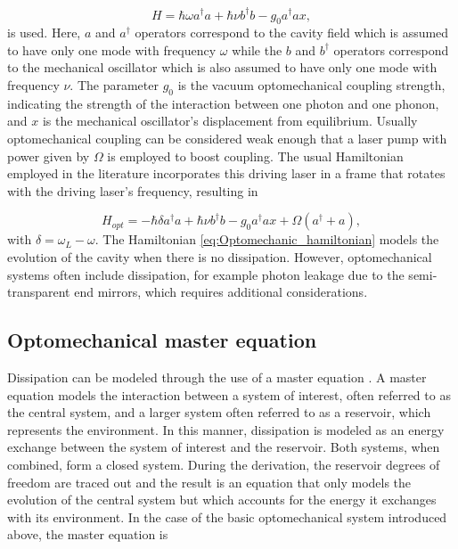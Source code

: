 \documentclass[12pt]{article}
\begin{document}
\begin{equation}\label{eq:basic_hamiltonian}
    H=\hbar \omega a^\dagger a + \hbar\nu b^\dagger b - g_0 a^\dagger a x,
\end{equation}  is used. Here, $a$ and $a^\dagger$ operators correspond to the cavity field which is assumed to have only one mode with frequency $\omega$ while the $b$ and $b^\dagger$ operators correspond to the mechanical oscillator which is also assumed to have only one mode with frequency $\nu$. The parameter $g_0$ is the vacuum optomechanical coupling strength, indicating the strength of the interaction between one photon and one phonon, and $x$ is the mechanical oscillator's displacement from equilibrium.  Usually optomechanical coupling can be considered weak enough that a laser pump with power given by $\Omega$ is employed to boost coupling. The usual Hamiltonian employed in the literature incorporates this driving laser in a frame that rotates with the driving laser's frequency, resulting in

\begin{equation}\label{eq:Optomechanic_hamiltonian}
    H_{opt}=-\hbar \delta a^\dagger a + \hbar\nu b^\dagger b - g_0 a^\dagger a x + \Omega(a^\dagger+a),
\end{equation} with $\delta = \omega_L-\omega$. The Hamiltonian \eqref{eq:Optomechanic_hamiltonian} models the evolution of the cavity when there is no dissipation. However, optomechanical systems often include dissipation, for example photon leakage due to the semi-transparent end mirrors, which requires additional considerations.

\subsection{Optomechanical master equation}

Dissipation can be modeled through the use of a master equation \cite{CarmichaelQuantumOptics1999}. A master equation models the interaction between a system of interest, often referred to as the central system, and a larger system often referred to as a reservoir, which represents the environment. In this manner, dissipation is modeled as an energy exchange between the system of interest and the reservoir. Both systems, when combined, form a closed system. During the derivation, the reservoir degrees of freedom are traced out and the result is an equation that only models the evolution of the central system but which accounts for the energy it exchanges with its environment. In the case of the basic optomechanical system introduced above, the master equation is
\end{document}
